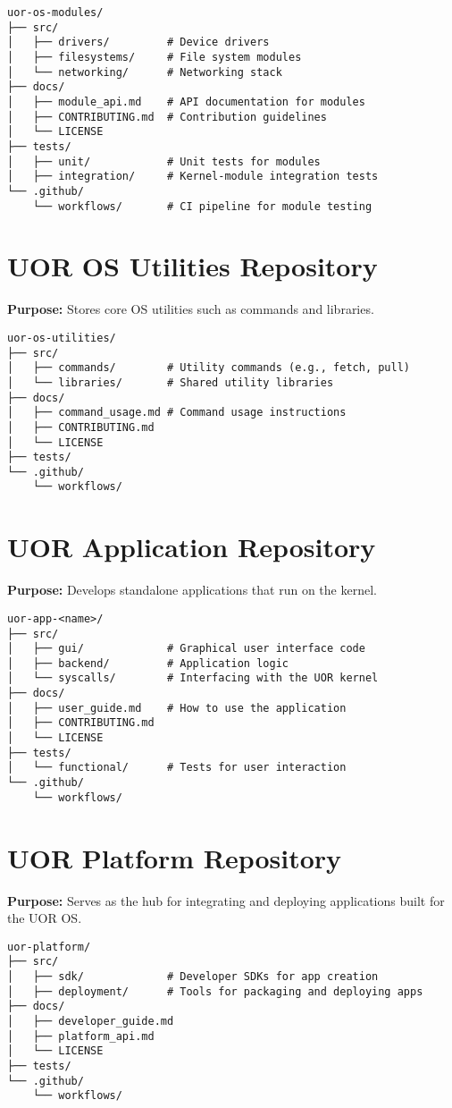 \documentclass{article}
\begin{document}
\begin{verbatim}
uor-os-modules/
├── src/
│   ├── drivers/         # Device drivers
│   ├── filesystems/     # File system modules
│   └── networking/      # Networking stack
├── docs/
│   ├── module_api.md    # API documentation for modules
│   ├── CONTRIBUTING.md  # Contribution guidelines
│   └── LICENSE
├── tests/
│   ├── unit/            # Unit tests for modules
│   ├── integration/     # Kernel-module integration tests
└── .github/
    └── workflows/       # CI pipeline for module testing
\end{verbatim}

\section{UOR OS Utilities Repository}
\textbf{Purpose:} Stores core OS utilities such as commands and libraries.

\begin{verbatim}
uor-os-utilities/
├── src/
│   ├── commands/        # Utility commands (e.g., fetch, pull)
│   └── libraries/       # Shared utility libraries
├── docs/
│   ├── command_usage.md # Command usage instructions
│   ├── CONTRIBUTING.md
│   └── LICENSE
├── tests/
└── .github/
    └── workflows/
\end{verbatim}

\section{UOR Application Repository}
\textbf{Purpose:} Develops standalone applications that run on the kernel.

\begin{verbatim}
uor-app-<name>/
├── src/
│   ├── gui/             # Graphical user interface code
│   ├── backend/         # Application logic
│   └── syscalls/        # Interfacing with the UOR kernel
├── docs/
│   ├── user_guide.md    # How to use the application
│   ├── CONTRIBUTING.md
│   └── LICENSE
├── tests/
│   └── functional/      # Tests for user interaction
└── .github/
    └── workflows/
\end{verbatim}

\section{UOR Platform Repository}
\textbf{Purpose:} Serves as the hub for integrating and deploying applications built for the UOR OS.

\begin{verbatim}
uor-platform/
├── src/
│   ├── sdk/             # Developer SDKs for app creation
│   ├── deployment/      # Tools for packaging and deploying apps
├── docs/
│   ├── developer_guide.md
│   ├── platform_api.md
│   └── LICENSE
├── tests/
└── .github/
    └── workflows/
\end{verbatim}
\end{document}
